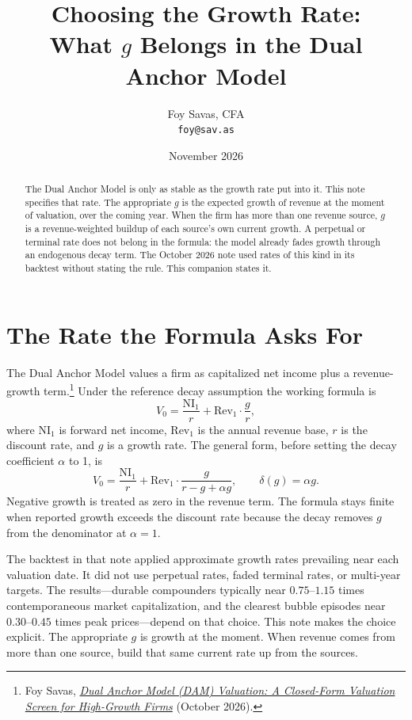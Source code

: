\documentclass[11pt]{article}
\title{Choosing the Growth Rate:\\
What \(g\) Belongs in the Dual Anchor Model}
\author{Foy Savas, CFA\\ \texttt{foy@sav.as}}
\date{November 2026}
\begin{document}
\maketitle

\begin{abstract}
The Dual Anchor Model is only as stable as the growth rate put into it. This note specifies that rate. The appropriate \(g\) is the expected growth of revenue at the moment of valuation, over the coming year. When the firm has more than one revenue source, \(g\) is a revenue-weighted buildup of each source's own current growth. A perpetual or terminal rate does not belong in the formula: the model already fades growth through an endogenous decay term. The October 2026 note used rates of this kind in its backtest without stating the rule. This companion states it.
\end{abstract}

\section{The Rate the Formula Asks For}
The Dual Anchor Model values a firm as capitalized net income plus a revenue-growth term.\footnote{Foy Savas, \href{Dual_Anchor_Model.pdf}{\textit{Dual Anchor Model (DAM) Valuation: A Closed-Form Valuation Screen for High-Growth Firms}} (October 2026).} Under the reference decay assumption the working formula is
\begin{equation}
V_0 = \frac{\mathrm{NI}_1}{r} + \mathrm{Rev}_1 \cdot \frac{g}{r},
\end{equation}
where \(\mathrm{NI}_1\) is forward net income, \(\mathrm{Rev}_1\) is the annual revenue base, \(r\) is the discount rate, and \(g\) is a growth rate. The general form, before setting the decay coefficient \(\alpha\) to 1, is
\begin{equation}
V_0 = \frac{\mathrm{NI}_1}{r} + \mathrm{Rev}_1 \cdot \frac{g}{r - g + \alpha g}, \qquad \delta(g) = \alpha g.
\end{equation}
Negative growth is treated as zero in the revenue term. The formula stays finite when reported growth exceeds the discount rate because the decay removes \(g\) from the denominator at \(\alpha = 1\).

The backtest in that note applied approximate growth rates prevailing near each valuation date. It did not use perpetual rates, faded terminal rates, or multi-year targets. The results---durable compounders typically near \(0.75\)--\(1.15\) times contemporaneous market capitalization, and the clearest bubble episodes near \(0.30\)--\(0.45\) times peak prices---depend on that choice. This note makes the choice explicit. The appropriate \(g\) is growth at the moment. When revenue comes from more than one source, build that same current rate up from the sources.
\end{document}
